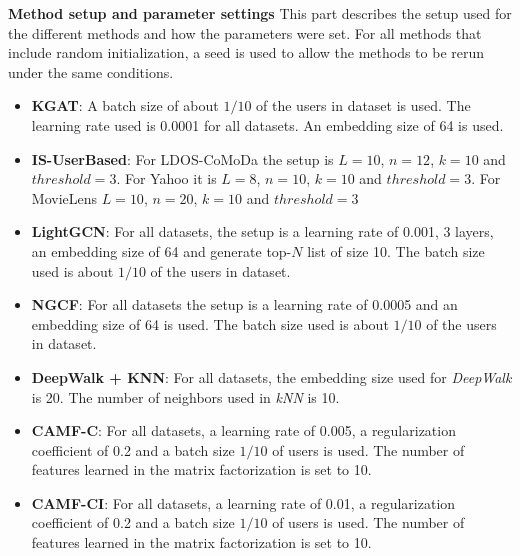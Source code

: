 \textbf{Method setup and parameter settings}
This part describes the setup used for the different methods and how the parameters were set.
For all methods that include random initialization, a seed is used to allow the methods to be rerun under the same conditions.
\begin{itemize}
    \item \textbf{KGAT}: A batch size of about $1/10$ of the users in dataset is used. The learning rate used is 0.0001 for all datasets. An embedding size of 64 is used.
    \item \textbf{IS-UserBased}: For LDOS-CoMoDa the setup is $L=10$, $n=12$, $k=10$ and $threshold=3$. For Yahoo it is $L=8$, $n=10$, $k=10$ and $threshold=3$. For MovieLens $L=10$, $n=20$, $k=10$ and $threshold=3$
    \item \textbf{LightGCN}: For all datasets, the setup is a learning rate of 0.001, 3 layers, an embedding size of 64 and generate top-$N$ list of size 10. The batch size used is about $1/10$ of the users in dataset.
    \item \textbf{NGCF}: For all datasets the setup is a learning rate of 0.0005 and an embedding size of 64 is used. The batch size used is about $1/10$ of the users in dataset.
    \item \textbf{DeepWalk + KNN}: For all datasets, the embedding size used for \textit{DeepWalk} is 20. The number of neighbors used in \textit{kNN} is 10.
    \item \textbf{CAMF-C}: For all datasets, a learning rate of 0.005, a regularization coefficient of 0.2 and a batch size $1/10$ of users is used. The number of features learned in the matrix factorization is set to 10.
    \item \textbf{CAMF-CI}: For all datasets, a learning rate of 0.01, a regularization coefficient of 0.2 and a batch size $1/10$ of users is used. The number of features learned in the matrix factorization is set to 10.
\end{itemize}